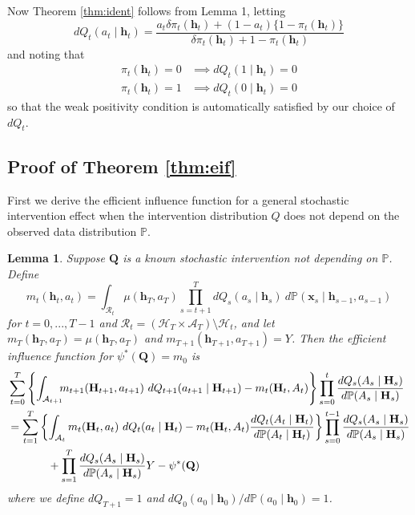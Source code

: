 \documentclass[12pt]{article}
\newcommand{\Pb}{\mathbb{P}}
\newcommand{\bx}{\mathbf{x}}
\newcommand{\bH}{\mathbf{H}}
\newcommand{\bh}{\mathbf{h}}
\newcommand{\bQ}{\mathbf{Q}}
\newtheorem{lemma}{Lemma}
\theoremstyle{remark}
\begin{document}
Now Theorem \ref{thm:ident} follows from Lemma 1, letting
$$ dQ_t(a_t \mid \bh_t) = \frac{ a_t \delta \pi_t(\bh_t) + (1-a_t) \{1-\pi_t(\bh_t)\} }{ \delta \pi_t(\bh_t) + 1-\pi_t(\bh_t) } $$
and noting that
\begin{align*}
\pi_t(\bh_t) = 0 &\implies dQ_t(1 \mid \bh_t) = 0 \\
\pi_t(\bh_t)=1 &\implies dQ_t(0 \mid \bh_t) = 0 
\end{align*}
so that the weak positivity condition is automatically satisfied by our choice of $dQ_t$.

\subsection{Proof of Theorem \ref{thm:eif}}
\label{sec:proof_eif}

First we derive the efficient influence function for a general stochastic intervention effect when the intervention distribution $Q$ does not depend on the observed data distribution $\Pb$. 

\begin{lemma}
\label{lem:eif_qknown}
Suppose $\bQ$ is a known stochastic intervention not depending on $\Pb$. Define
$$ m_t(\bh_t,a_t) = \int_{\mathcal{R}_t} \mu(\bh_T,a_T) \prod_{s={t+1}}^T  dQ_s(a_s \mid \bh_s) \ d\Pb(\bx_{s} \mid \bh_{s-1},a_{s-1}) $$
for $t=0,...,T-1$ and $\mathcal{R}_t= (\mathcal{H}_T \times \mathcal{A}_T) \setminus \mathcal{H}_t$, and let $m_T(\bh_T,a_T)=\mu(\bh_T,a_T)$ and $m_{T+1}(\bh_{T+1},a_{T+1})=Y$. Then the efficient influence function for $\psi^*(\bQ)=m_0$ is
\begin{align*}
& \sum_{t=0}^{T} \left\{ \int_{\mathcal{A}_{t+1}} \!\!\! m_{t+1}(\bH_{t+1},a_{t+1}) \ dQ_{t+1}(a_{t+1} \mid \bH_{t+1}) - m_{t}(\bH_{t},A_{t}) \right\} \prod_{s=0}^{t} \frac{ dQ_s(A_s \mid \bH_s) }{ d\Pb(A_s \mid \bH_s) } \\
&= \sum_{t=1}^T \left\{ \int_{\mathcal{A}_t} m_t(\bH_t,a_t) \ dQ_t(a_t \mid \bH_t) -  m_t ( \bH_t,A_{t}) \frac{ dQ_t(A_t \mid \bH_t) }{ d\Pb(A_t \mid \bH_t) } \right\}  \prod_{s=0}^{t-1} \frac{ dQ_s(A_s \mid \bH_s) }{ d\Pb(A_s \mid \bH_s) } \\
& \hspace{.5in} + \prod_{s=1}^T \frac{ dQ_s(A_s \mid \bH_s) }{ d\Pb(A_s \mid \bH_s) } Y - \psi^*(\bQ) 
\end{align*}
where we define $dQ_{T+1}=1$ and $dQ_0(a_0 \mid \bh_0)/d\Pb(a_0 \mid \bh_0)= 1$.
\end{lemma}
\end{document}
